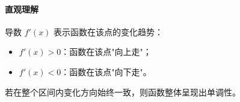 \paragraph{直观理解}

导数 $f'(x)$ 表示函数在该点的变化趋势：
\begin{itemize}
  \item $f'(x) > 0$：函数在该点"向上走"；
  \item $f'(x) < 0$：函数在该点"向下走"。
\end{itemize}

若在整个区间内变化方向始终一致，则函数整体呈现出单调性。
